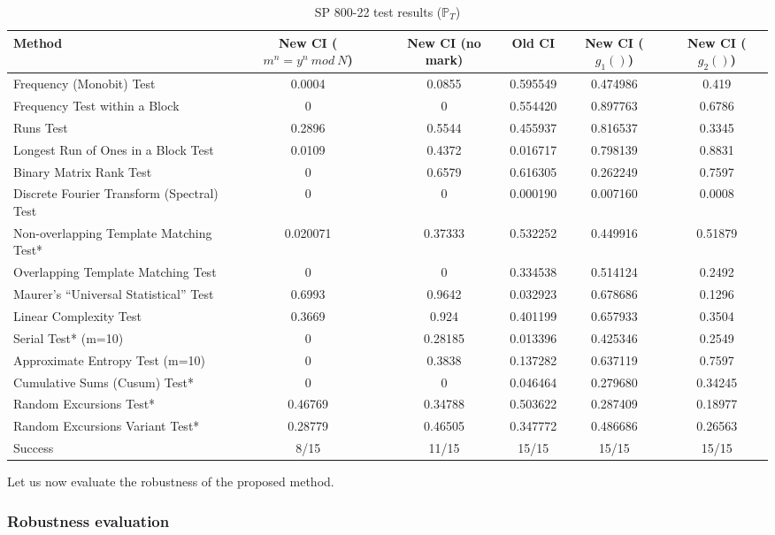 \documentclass[journal]{IEEEtran}
\begin{document}
\begin{table*}[!t]
\renewcommand{\arraystretch}{1.3}
\caption{SP 800-22 test results ($\mathbb{P}_T$)}
\label{The passing rate}
\centering
\begin{tabular}{|l||c|c|c|c|c|}
\hline
Method & New CI ($m^n=y^n~mod~N$)& New CI (no mark)& Old CI & New CI ($g_1()$)&New CI ($g_2()$)\\ \hline\hline

Frequency (Monobit) Test 			&0.0004&0.0855	&0.595549&0.474986 &0.419\\ \hline
Frequency Test within a Block  		&0&0	&0.554420&0.897763&0.6786\\ \hline
Runs Test  					&0.2896&0.5544	&0.455937&0.816537&0.3345\\ \hline
Longest Run of Ones in a Block Test 		&0.0109&0.4372	&0.016717&0.798139&0.8831 \\ \hline
Binary Matrix Rank Test  			&0&0.6579	&0.616305&0.262249&0.7597\\ \hline
Discrete Fourier Transform (Spectral) Test 	&0&0	&0.000190&0.007160&0.0008 \\ \hline
Non-overlapping Template Matching Test* 	&0.020071&0.37333&0.532252&0.449916& 0.51879\\ \hline
Overlapping Template Matching Test	&0&0	 &0.334538&0.514124 	&0.2492\\ \hline
Maurer's ``Universal Statistical'' Test  	&0.6993&0.9642	&0.032923&0.678686&0.1296\\ \hline
Linear Complexity Test 			&0.3669&0.924	&0.401199&0.657933 &0.3504\\ \hline
Serial Test* (m=10) 			&0&0.28185&0.013396&0.425346 	&0.2549\\ \hline
Approximate Entropy Test (m=10) 	&0&0.3838	&0.137282&0.637119 	&0.7597\\ \hline
Cumulative Sums (Cusum) Test* 		&0&0	&0.046464&0.279680&0.34245\\ \hline
Random Excursions Test* 			&0.46769&0.34788&0.503622&0.287409 &0.18977\\ \hline
Random Excursions Variant Test* 		&0.28779&0.46505&0.347772&0.486686& 0.26563\\ \hline
Success 				&8/15&11/15	& 15/15 & 15/15 	&15/15\\ \hline
\hline
\end{tabular}
\end{table*}

Let us now evaluate the robustness of the proposed method.


\subsubsection{Robustness evaluation}
\end{document}
